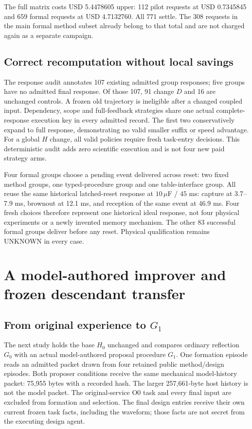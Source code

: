 The full matrix costs USD 5.4478605 upper: 112 pilot requests at USD 0.7345845
and 659 formal requests at USD 4.7132760. All 771 settle. The 308 requests in
the main formal method subset already belong to that total and are not charged
again as a separate campaign.

\subsection{Correct recomputation without local savings}
The response audit annotates 107 existing admitted group responses; five groups
have no admitted final response. Of those 107, 91 change $D$ and 16 are unchanged
controls. A frozen old trajectory is ineligible after a changed coupled input.
Dependency, scope and full-feedback strategies share one actual complete-response
execution key in every admitted record. The first two conservatively expand to
full response, demonstrating no valid smaller suffix or speed advantage. For
a global $H$ change, all valid policies require fresh task-entry decisions.
This deterministic audit adds zero scientific execution and is not four new
paid strategy arms.

Four formal groups choose a pending event delivered across reset: two fixed
method groups, one typed-procedure group and one table-interface group. All
reuse the same historical latched-reset response at $10\,\mu$F / $45$ ms:
capture at 3.7--7.9 ms, brownout at 12.1 ms, and reception of the same event at
46.9 ms. Four fresh choices therefore represent one historical ideal response,
not four physical experiments or a newly invented memory mechanism. The other
83 successful formal groups deliver before any reset. Physical qualification
remains UNKNOWN in every case.

\section{A model-authored improver and frozen descendant transfer}
\subsection{From original experience to $G_1$}
The next study holds the base $H_0$ unchanged and compares ordinary reflection
$G_0$ with an actual model-authored proposal procedure $G_1$. One formation
episode reads an admitted packet drawn from four retained public method/design
episodes. Both proposer conditions receive the same mechanical model-history
packet: 75,955 bytes with a recorded hash. The larger 257,661-byte host history
is not the model packet. The original-service O0 task and every final input are
excluded from formation and selection. The final design entries receive their
own current frozen task facts, including the waveform; those facts are not
secret from the executing design agent.

